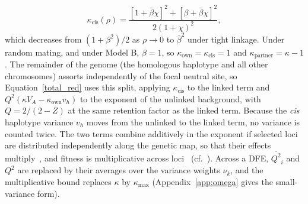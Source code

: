 \documentclass{article}
\begin{document}
\begin{equation}
    \kappa_\text{cis}(\rho) = \frac{\left[1 + \bar{\beta}\chi\right]^2 + \left[\beta + \bar{\beta}\chi\right]^2}{2(1+\chi)^2},
\end{equation}
which decreases from $(1+\beta^2)/2$ as $\rho \to 0$ to $\bar{\beta}^2$ under tight linkage. Under random mating, and under Model B, $\beta = 1$, so $\kappa_\text{own} = \kappa_\text{cis} = 1$ and $\kappa_\text{partner} = \kappa - 1$. The remainder of the genome (the homologous haplotype and all other chromosomes) assorts independently of the focal neutral site, so Equation~\eqref{total_red} uses this split, applying $\kappa_\text{cis}$ to the linked term and $Q^2(\kappa V_A - \kappa_\text{own}v_h)$ to the exponent of the unlinked background, with $Q = 2/(2-Z)$ at the same retention factor as the linked term. Because the \emph{cis} haplotype variance $v_h$ moves from the unlinked to the linked term, no variance is counted twice. The two terms combine additively in the exponent if selected loci are distributed independently along the genetic map, so that their effects multiply~\cite{hudson1995,santiago2016}, and fitness is multiplicative across loci~\cite[Supplementary Equations~28--29]{buffaloKern2024} (cf.~\cite{santiago1998}). Across a DFE, $\overline{Q^2}_i$ and $Q^2$ are replaced by their averages over the variance weights $\nu_k$, and the multiplicative bound replaces $\kappa$ by $\kappa_\text{max}$ (Appendix~\ref{app:omega} gives the small-variance form).
\end{document}

